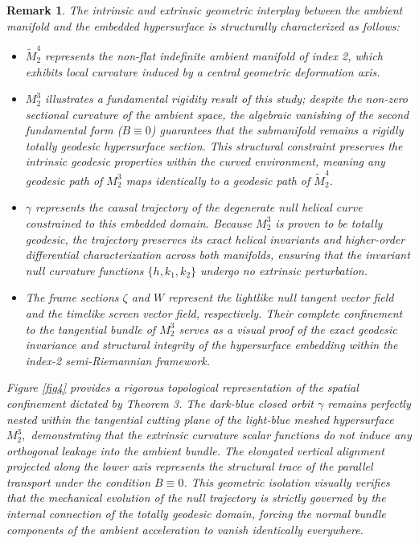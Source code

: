 \documentclass [reqno]{amsart}
\theoremstyle{plain}
\newtheorem{remark}{Remark}
\numberwithin{equation}{section}
\begin{document}
\begin{remark}
The intrinsic and extrinsic geometric interplay between the ambient manifold and the embedded hypersurface is structurally characterized as follows:
\begin{itemize}
    \item $\tilde{M}_2^4$ represents the non-flat indefinite ambient manifold of index 2, which exhibits local curvature induced by a central geometric deformation axis.
    \item $M_2^3$ illustrates a fundamental rigidity result of this study; despite the non-zero sectional curvature of the ambient space, the algebraic vanishing of the second fundamental form ($B\equiv 0$) guarantees that the submanifold remains a rigidly totally geodesic hypersurface section. This structural constraint preserves the intrinsic geodesic properties within the curved environment, meaning any geodesic path of $M_2^3$ maps identically to a geodesic path of $\tilde{M}_2^4$.
    \item $\gamma$ represents the causal trajectory of the degenerate null helical curve constrained to this embedded domain. Because $M_2^3$ is proven to be totally geodesic, the trajectory preserves its exact helical invariants and higher-order differential characterization across both manifolds, ensuring that the invariant null curvature functions $\{h,k_1,k_2\}$ undergo no extrinsic perturbation.
    \item The frame sections $\zeta$ and $W$ represent the lightlike null tangent vector field and the timelike screen vector field, respectively. Their complete confinement to the tangential bundle of $M_2^3$ serves as a visual proof of the exact geodesic invariance and structural integrity of the hypersurface embedding within the index-2 semi-Riemannian framework.
\end{itemize}

Figure \ref{fig4} provides a rigorous topological representation of the spatial confinement dictated by Theorem 3. The dark-blue closed orbit $\gamma$ remains perfectly nested within the tangential cutting plane of the light-blue meshed hypersurface $M_2^3, $ demonstrating that the extrinsic curvature scalar functions do not induce any orthogonal leakage into the ambient bundle. The elongated vertical alignment projected along the lower axis represents the structural trace of the parallel transport under the condition $B\equiv 0$. This geometric isolation visually verifies that the mechanical evolution of the null trajectory is strictly governed by the internal connection of the totally geodesic domain, forcing the normal bundle components of the ambient acceleration to vanish identically everywhere.
\end{remark}
\end{document}
